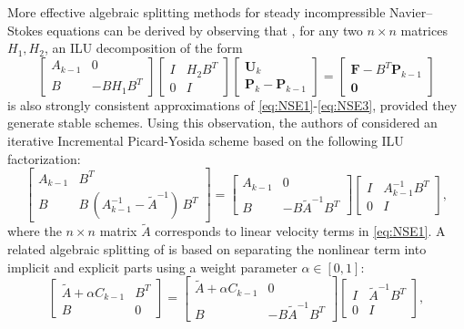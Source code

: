 \documentclass[3p]{elsarticle}
\def\V#1{\mathbf{#1}}
\begin{document}
More effective algebraic splitting methods for steady incompressible Navier–Stokes equations can be derived by observing that \cite{VIGUERIE2018271}, for any two $n \times n$ matrices $H_1, H_2$, an ILU decomposition of the form
\begin{equation}\label{eq:PicardSystem3}
\begin{bmatrix} 
A_{k-1} & 0 \\ 
B &  -B H_1 B^T 
\end{bmatrix}
\begin{bmatrix} 
I & H_2 B^T \\
0 & I 
\end{bmatrix}
\begin{bmatrix} \V{U}_k  \\ 
\V{P}_k - \V{P}_{k-1} 
\end{bmatrix}
= \begin{bmatrix} \V{F} - B^T \V{P}_{k-1} \\ \V{0} \end{bmatrix} 
\end{equation}
is also strongly consistent approximations of \eqref{eq:NSE1}-\eqref{eq:NSE3}, provided they generate stable schemes. Using this observation, the authors of \cite{rebholz2019efficient} considered an iterative Incremental Picard-Yosida scheme based on the following ILU factorization:
\begin{equation}\label{eq:IPY}
\begin{bmatrix} 
A_{k-1} & B^T \\ 
B &   B\, \left(A^{-1}_{k-1} -  \widetilde{A}^{-1}\right) \, B^T
\end{bmatrix}
= 
\begin{bmatrix} 
A_{k-1} & 0 \\ 
B &  -B \widetilde{A}^{-1} B^T 
\end{bmatrix}
\begin{bmatrix} 
I & A^{-1}_{k-1} B^T \\
0 & I 
\end{bmatrix},
\end{equation}
where the $n\times n$ matrix $\widetilde{A}$ corresponds to linear velocity terms in \eqref{eq:NSE1}. 
A related algebraic splitting of \cite{VIGUERIE2018271} is based on separating the nonlinear term into implicit and explicit parts using a weight parameter $\alpha \in [0,1]$:
\begin{equation}\label{eq:PicardSystem4}
\begin{bmatrix} 
\widetilde{A} + \alpha C_{k-1} & B^T \\ 
B &  0 
\end{bmatrix} = 
\begin{bmatrix} 
\widetilde{A} + \alpha C_{k-1} & 0 \\ 
B &  -B \widetilde{A}^{-1} B^T 
\end{bmatrix}
\begin{bmatrix} 
I & \widetilde{A}^{-1} B^T \\
0 & I 
\end{bmatrix},    
\end{equation}
\end{document}
